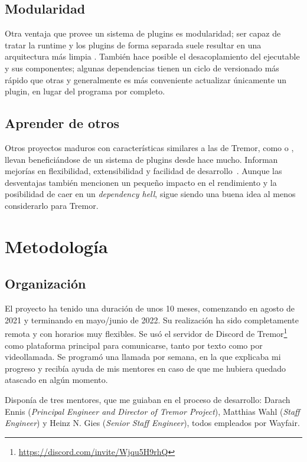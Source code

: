 \subsection{Modularidad}

Otra ventaja que provee un sistema de plugins es modularidad; ser capaz de
tratar la runtime y los plugins de forma separada suele resultar en una
arquitectura más limpia \cite{baldwin2000design}. También hace posible el
desacoplamiento del ejecutable y sus componentes; algunas dependencias tienen un
ciclo de versionado más rápido que otras y generalmente es más conveniente
actualizar únicamente un plugin, en lugar del programa por completo.

\subsection{Aprender de otros}

Otros proyectos maduros con características similares a las de Tremor, como
\textcite{nginx} o \textcite{apachehttpserver}, llevan beneficiándose de un
sistema de plugins desde hace mucho. Informan mejorías en flexibilidad,
extensibilidad y facilidad de
desarrollo~\cite{nginxPluginsAdvantages}\cite{apachePluginsAdvantages}. Aunque
las desventajas también mencionen un pequeño impacto en el rendimiento y la
posibilidad de caer en un \emph{dependency hell}, sigue siendo una buena idea al
menos considerarlo para Tremor.

\section{Metodología}

\subsection{Organización}

El proyecto ha tenido una duración de unos 10 meses, comenzando en agosto de
2021 y terminando en mayo/junio de 2022. Su realización ha sido completamente
remota y con horarios muy flexibles. Se usó el servidor de Discord de
Tremor\footnote{\url{https://discord.com/invite/Wjqu5H9rhQ}} como plataforma
principal para comunicarse, tanto por texto como por videollamada. Se programó
una llamada por semana, en la que explicaba mi progreso y recibía ayuda de mis
mentores en caso de que me hubiera quedado atascado en algún momento.

Disponía de tres mentores, que me guiaban en el proceso de desarrollo: Darach
Ennis (\emph{Principal Engineer and Director of Tremor Project}), Matthias Wahl
(\emph{Staff Engineer}) y Heinz N. Gies (\emph{Senior Staff Engineer}), todos
empleados por Wayfair.


